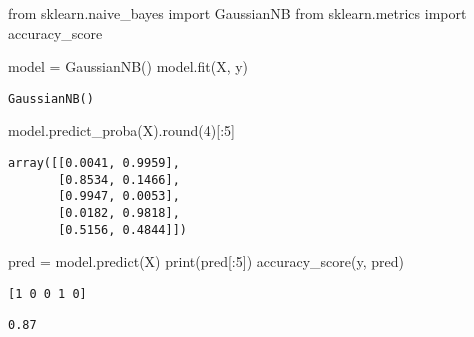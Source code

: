\documentclass[
  letterpaper,
  DIV=11,
  numbers=noendperiod]{scrreprt}
\newenvironment{Shaded}{\begin{snugshade}}{\end{snugshade}}
\newcommand{\BuiltInTok}[1]{\textcolor[rgb]{0.00,0.23,0.31}{#1}}
\newcommand{\DecValTok}[1]{\textcolor[rgb]{0.68,0.00,0.00}{#1}}
\newcommand{\ImportTok}[1]{\textcolor[rgb]{0.00,0.46,0.62}{#1}}
\newcommand{\NormalTok}[1]{\textcolor[rgb]{0.00,0.23,0.31}{#1}}
\newcommand{\OperatorTok}[1]{\textcolor[rgb]{0.37,0.37,0.37}{#1}}
\begin{document}
\begin{Shaded}
\begin{Highlighting}[]
\ImportTok{from}\NormalTok{ sklearn.naive\_bayes }\ImportTok{import}\NormalTok{ GaussianNB }
\ImportTok{from}\NormalTok{ sklearn.metrics }\ImportTok{import}\NormalTok{ accuracy\_score }
\end{Highlighting}
\end{Shaded}

\begin{Shaded}
\begin{Highlighting}[]
\NormalTok{model }\OperatorTok{=}\NormalTok{ GaussianNB()}
\NormalTok{model.fit(X, y) }
\end{Highlighting}
\end{Shaded}

\begin{verbatim}
GaussianNB()
\end{verbatim}

\begin{Shaded}
\begin{Highlighting}[]
\NormalTok{model.predict\_proba(X).}\BuiltInTok{round}\NormalTok{(}\DecValTok{4}\NormalTok{)[:}\DecValTok{5}\NormalTok{]}
\end{Highlighting}
\end{Shaded}

\begin{verbatim}
array([[0.0041, 0.9959],
       [0.8534, 0.1466],
       [0.9947, 0.0053],
       [0.0182, 0.9818],
       [0.5156, 0.4844]])
\end{verbatim}

\begin{Shaded}
\begin{Highlighting}[]
\NormalTok{pred }\OperatorTok{=}\NormalTok{ model.predict(X) }
\BuiltInTok{print}\NormalTok{(pred[:}\DecValTok{5}\NormalTok{])}
\NormalTok{accuracy\_score(y, pred)}
\end{Highlighting}
\end{Shaded}

\begin{verbatim}
[1 0 0 1 0]
\end{verbatim}

\begin{verbatim}
0.87
\end{verbatim}
\end{document}
